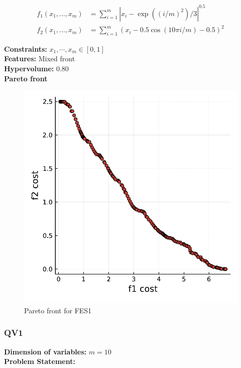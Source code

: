 \documentclass[11pt,oneside,onecolumn,openright]{article}
\begin{document}
  \begin{equation}
  \begin{aligned}
  f_{1}\left(x_{1}, \ldots, x_{m}\right)&=\sum_{i=1}^{m}\left|x_{i}-\exp \left((i / m)^{2}\right) / 3\right|^{0.5} \\
  f_{2}\left(x_{1}, \ldots, x_{m}\right)&=\sum_{i=1}^{m}\left(x_{i}-0.5 \cos (10 \pi i / m)-0.5\right)^{2}
  \end{aligned}
  \end{equation}

  \noindent\textbf{Constraints: } $x_{1},\cdots , x_{m} \in[0,1]$\\
  \noindent\textbf{Features: } Mixed front\\
  \noindent\textbf{Hypervolume: } 0.80\\
  \noindent\textbf{Pareto front}
      \begin{figure}[H]
      \centering
      \includegraphics[width=12cm]{fig/FES1.pdf}
      \cprotect\caption{Pareto front for FES1}
      \end{figure}

   \subsubsection{QV1~\cite{huband2006review}}
   \textbf{Dimension of variables: }$m=10$\\
  \noindent\textbf{Problem Statement: }
\end{document}
